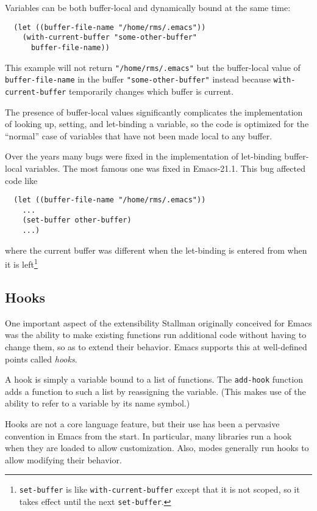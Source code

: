 \documentclass[format=acmsmall, review=false, screen=true]{acmart}
\begin{document}
Variables can be both buffer-local and dynamically bound at the same time:
\begin{verbatim}
  (let ((buffer-file-name "/home/rms/.emacs"))
    (with-current-buffer "some-other-buffer"
      buffer-file-name))
\end{verbatim}
This example will not return \texttt{"/home/rms/.emacs"} but the
buffer-local value of \texttt{buffer-file-name} in the buffer
\texttt{"some-other-buffer"} instead because \texttt{with-current-buffer}
temporarily changes which buffer is current.

The presence of buffer-local values significantly complicates the
implementation of looking up, setting, and let-binding a variable, so the
code is optimized for the ``normal'' case of variables that have not been
made local to any buffer.

Over the years many bugs were fixed in the implementation of let-binding
buffer-local variables.  The most famous one was fixed in Emacs-21.1.
This bug affected code like
\begin{verbatim}
  (let ((buffer-file-name "/home/rms/.emacs"))
    ...
    (set-buffer other-buffer)
    ...)
\end{verbatim}
where the current buffer was different when the let-binding is entered from
when it is left\footnote{\texttt{set-buffer} is like
  \texttt{with-current-buffer} except that it is not scoped, so it takes
  effect until the next \texttt{set-buffer}.}

\subsection{Hooks}
\label{sec:hooks}

One important aspect of the extensibility Stallman originally
conceived for Emacs was the ability to make existing functions run
additional code without having to change them, so as to extend their
behavior.  Emacs supports this at well-defined points called
\emph{hooks}.

A hook is simply a variable bound to a list of functions.  The
\texttt{add-hook} function adds a function to such a list by
reassigning the variable.  (This makes use of the ability to refer to
a variable by its name symbol.)

Hooks are not a core language feature, but their use has been a
pervasive convention in Emacs from the start.  In particular, many
libraries run a hook when they are loaded to allow customization.
Also, modes generally run hooks to allow modifying their behavior.
\end{document}
